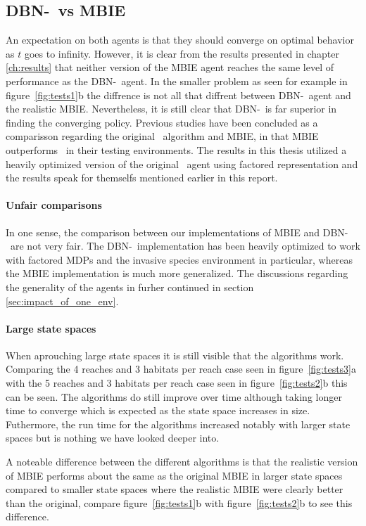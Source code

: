 \subsection{DBN-\etre\ vs MBIE }
An expectation on both agents is that they should converge on optimal behavior as $t$ goes to infinity. However, it is clear from the results presented in chapter \ref{ch:results} that neither version of the MBIE agent reaches the same level of performance as the DBN-\etre\ agent. In the smaller problem as seen for example in figure~\ref{fig:tests1}b the diffrence is not all that diffrent between DBN-\etre\ agent and the realistic MBIE. Nevertheless, it is still clear that DBN-\etre\ is far superior in finding the converging policy. Previous studies have been concluded as a comparisson regarding the original \etre\ algorithm and MBIE, in \textcite{strehl2004empirical} that MBIE outperforms \etre\ in their testing environments. The results in this thesis utilized a heavily optimized version of the original \etre\ agent using factored representation and the results speak for themselfs mentioned earlier in this report. 

\paragraph{Unfair comparisons} In one sense, the comparison between our implementations of MBIE and DBN-\etre\ are not very fair. The DBN-\etre\ implementation has been heavily optimized to work with factored MDPs and the invasive species environment in particular, whereas the MBIE implementation is much more generalized. The discussions regarding the generality of the agents in furher continued in section \ref{sec:impact_of_one_env}.

\paragraph{Large state spaces}
When aprouching large state spaces it is still visible that the algorithms work. Comparing the 4 reaches and 3 habitats per reach case seen in figure~\ref{fig:tests3}a with the 5 reaches and 3 habitats per reach case seen in figure~\ref{fig:tests2}b this can be seen. The algorithms do still improve over time although taking longer time to converge which is expected as the state space increases in size. Futhermore, the run time for the algorithms increased notably with larger state spaces but is nothing we have looked deeper into.  

A noteable difference between the different algorithms is that the realistic version of MBIE performs about the same as the original MBIE in larger state spaces compared to smaller state spaces where the realistic MBIE were clearly better than the original, compare figure~\ref{fig:tests1}b with figure~\ref{fig:tests2}b to see this difference. 

